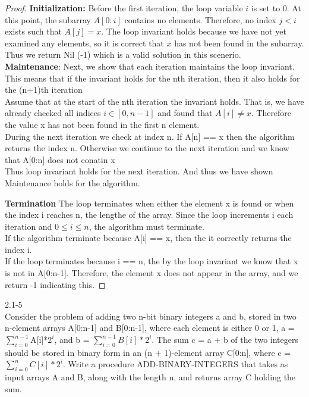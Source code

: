 \begin{proof} 

\textbf{Initialization:} Before the first iteration, the loop variable $i$ is set to $0$.
At this point, the subarray $A[0:i]$ contains no elements. Therefore, no index $j < i$
exists such that $A[j] = x$. The loop invariant holds because we have not yet examined
any elements, so it is correct that $x$ has not been found in the subarray. Thus we return
Nil (-1) which is a valid solution in this scenerio. \\

\textbf{Maintenance}: Next, we show that each iteration maintains the loop invariant. This means that if the invariant holds for the 
nth iteration, then it also holds for the (n+1)th iteration \\

Assume that at the start of the nth iteration the invariant holds. That is, we have already checked all indices 
$i \in [0,n-1]$ and found that $A[i] \neq x$. Therefore the value x has not been found in the first n element. \\ 

During the next iteration we check at index n. If A[n] == x then the algorithm returns the index n. Otherwise we continue
to the next iteration and we know that A[0:n] does not conatin x \\

Thus loop invariant holds for the next iteration. And thus we have shown Maintenance holds for the algorithm. 

\textbf{Termination} The loop terminates when either the element x is found or when the index i reaches n,
the lengthe of the array. Since the loop increments i each iteration and $0 \leq i \leq n$, the algorithm must terminate. \\

If the algorithm terminate because A[i] == x, then the it correctly returns the index i. \\

If the loop terminates because i == n, the by the loop invariant we know that x is not in A[0:n-1]. Therefore, the element x does not appear in the array,
and we return -1 indicating this. 

\end{proof}

2.1-5 \\
Consider the problem of adding two n-bit binary integers a and b, stored in two n-element arrays
A[0:n-1] and B[0:n-1], where each element is either 0 or 1, a = $\sum_{i= 0}^{n-1}$A[i]*$2^i$, and b = $\sum_{i=0}^{n-1}B[i]*2^i$.
The sum c = a + b of the two integers should be stored in binary form in an (n + 1)-element array C[0:n], where c = $\sum_{i=0}^{n}C[i]*2^i$.
Write a procedure ADD-BINARY-INTEGERS that takes as input arrays A and B, along with the length n, and returns array C holding the sum. \\

